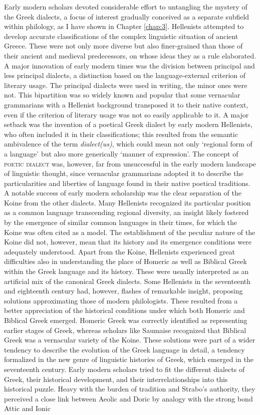 Early modern scholars devoted considerable effort to untangling the mystery of the Greek dialects, a focus of interest gradually conceived as a separate subfield within philology, as I have shown in Chapter \ref{chap:3}. Hellenists attempted to develop accurate classifications of the complex linguistic situation of ancient Greece. These were not only more diverse but also finer-grained than those of their ancient and medieval predecessors, on whose ideas they as a rule elaborated. A major innovation of early modern times was the division between principal and less principal dialects, a distinction based on the language-external criterion of literary usage. The principal dialects were used in writing, the minor ones were not. This bipartition was so widely known and popular that some vernacular grammarians with a Hellenist background transposed it to their native context, even if the criterion of literary usage was not so easily applicable to it. A major setback was the invention of a poetical Greek dialect by early modern Hellenists, who often included it in their classifications; this resulted from the semantic ambivalence of the term \textit{dialect(us)}, which could mean not only ‘regional form of a language’ but also more generically ‘manner of expression’. The concept of \textsc{poetic} \textsc{dialect} was, however, far from unsuccessful in the early modern landscape of linguistic thought, since vernacular grammarians adopted it to describe the particularities and liberties of language found in their native poetical traditions. A notable success of early modern scholarship was the clear separation of the Koine from the other dialects. Many Hellenists recognized its particular position as a common language transcending regional diversity, an insight likely fostered by the emergence of similar common languages in their times, for which the Koine was often cited as a model. The establishment of the peculiar nature of the Koine did not, however, mean that its history and its emergence conditions were adequately understood. Apart from the Koine, Hellenists experienced great difficulties also in understanding the place of Homeric as well as Biblical Greek within the Greek language and its history. These were usually interpreted as an artificial mix of the canonical Greek dialects. Some Hellenists in the seventeenth and eighteenth century had, however, flashes of remarkable insight, proposing solutions approximating those of modern philologists. These resulted from a better appreciation of the historical conditions under which both Homeric and Biblical Greek emerged. Homeric Greek was correctly identified as representing earlier stages of Greek, whereas scholars like Saumaise recognized that Biblical Greek was a vernacular variety of the Koine. These solutions were part of a wider tendency to describe the evolution of the Greek language in detail, a tendency formalized in the new genre of linguistic histories of Greek, which emerged in the seventeenth century. Early modern scholars tried to fit the different dialects of Greek, their historical development, and their interrelationships into this historical puzzle. Heavy with the burden of tradition and Strabo’s authority, they perceived a close link between Aeolic and Doric by analogy with the strong bond Attic and Ionic 